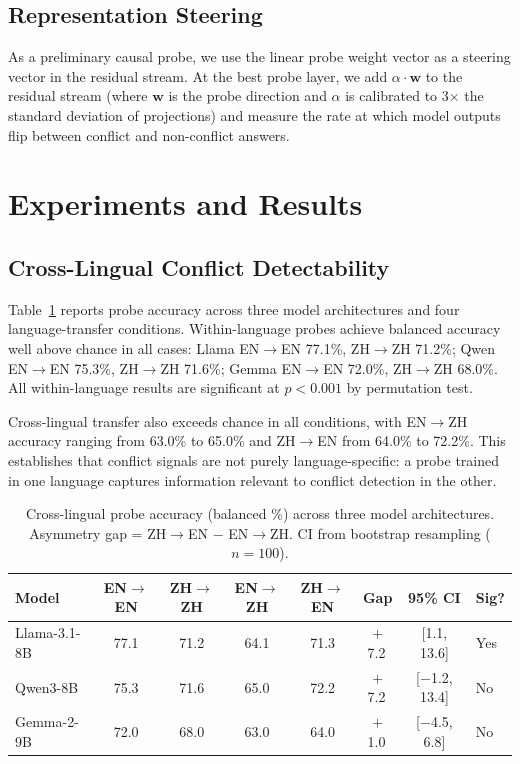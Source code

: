 \documentclass[11pt]{article}
\newcommand{\pp}{\,\text{pp}}
\begin{document}
\subsection{Representation Steering}

As a preliminary causal probe, we use the linear probe weight vector as a steering vector in the residual stream.
At the best probe layer, we add $\alpha \cdot \mathbf{w}$ to the residual stream (where $\mathbf{w}$ is the probe direction and $\alpha$ is calibrated to 3$\times$ the standard deviation of projections) and measure the rate at which model outputs flip between conflict and non-conflict answers.

\section{Experiments and Results}

\subsection{Cross-Lingual Conflict Detectability}
\label{sec:detectability}

Table~\ref{tab:probe} reports probe accuracy across three model architectures and four language-transfer conditions.
Within-language probes achieve balanced accuracy well above chance in all cases: Llama EN$\to$EN 77.1\%, ZH$\to$ZH 71.2\%; Qwen EN$\to$EN 75.3\%, ZH$\to$ZH 71.6\%; Gemma EN$\to$EN 72.0\%, ZH$\to$ZH 68.0\%.
All within-language results are significant at $p < 0.001$ by permutation test.

Cross-lingual transfer also exceeds chance in all conditions, with EN$\to$ZH accuracy ranging from 63.0\% to 65.0\% and ZH$\to$EN from 64.0\% to 72.2\%.
This establishes that conflict signals are not purely language-specific: a probe trained in one language captures information relevant to conflict detection in the other.

\begin{table}[t]
\centering
\caption{Cross-lingual probe accuracy (balanced \%) across three model architectures. Asymmetry gap = ZH$\to$EN $-$ EN$\to$ZH. CI from bootstrap resampling ($n=100$).}
\label{tab:probe}
\begin{tabular}{lccccccl}
\toprule
Model & EN$\to$EN & ZH$\to$ZH & EN$\to$ZH & ZH$\to$EN & Gap & 95\% CI & Sig? \\
\midrule
Llama-3.1-8B & 77.1 & 71.2 & 64.1 & 71.3 & $+$7.2\pp & [1.1, 13.6] & Yes \\
Qwen3-8B     & 75.3 & 71.6 & 65.0 & 72.2 & $+$7.2\pp & [$-$1.2, 13.4] & No \\
Gemma-2-9B   & 72.0 & 68.0 & 63.0 & 64.0 & $+$1.0\pp & [$-$4.5, 6.8] & No \\
\bottomrule
\end{tabular}
\end{table}
\end{document}
